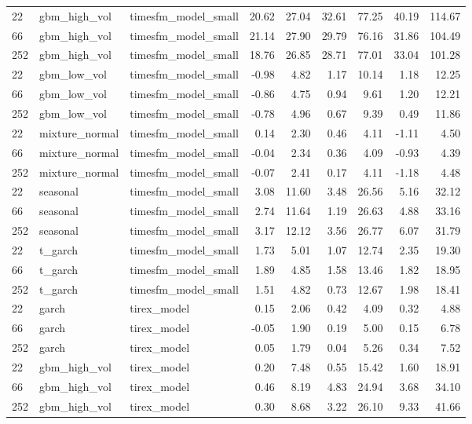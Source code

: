{\begin{tabular}{lllrrrrrr}
22 & gbm\_high\_vol & timesfm\_model\_small & 20.62 & 27.04 & 32.61 & 77.25 & 40.19 & 114.67 \\
66 & gbm\_high\_vol & timesfm\_model\_small & 21.14 & 27.90 & 29.79 & 76.16 & 31.86 & 104.49 \\
252 & gbm\_high\_vol & timesfm\_model\_small & 18.76 & 26.85 & 28.71 & 77.01 & 33.04 & 101.28 \\
\midrule
22 & gbm\_low\_vol & timesfm\_model\_small & -0.98 & 4.82 & 1.17 & 10.14 & 1.18 & 12.25 \\
66 & gbm\_low\_vol & timesfm\_model\_small & -0.86 & 4.75 & 0.94 & 9.61 & 1.20 & 12.21 \\
252 & gbm\_low\_vol & timesfm\_model\_small & -0.78 & 4.96 & 0.67 & 9.39 & 0.49 & 11.86 \\
\midrule
22 & mixture\_normal & timesfm\_model\_small & 0.14 & 2.30 & 0.46 & 4.11 & -1.11 & 4.50 \\
66 & mixture\_normal & timesfm\_model\_small & -0.04 & 2.34 & 0.36 & 4.09 & -0.93 & 4.39 \\
252 & mixture\_normal & timesfm\_model\_small & -0.07 & 2.41 & 0.17 & 4.11 & -1.18 & 4.48 \\
\midrule
22 & seasonal & timesfm\_model\_small & 3.08 & 11.60 & 3.48 & 26.56 & 5.16 & 32.12 \\
66 & seasonal & timesfm\_model\_small & 2.74 & 11.64 & 1.19 & 26.63 & 4.88 & 33.16 \\
252 & seasonal & timesfm\_model\_small & 3.17 & 12.12 & 3.56 & 26.77 & 6.07 & 31.79 \\
\midrule
22 & t\_garch & timesfm\_model\_small & 1.73 & 5.01 & 1.07 & 12.74 & 2.35 & 19.30 \\
66 & t\_garch & timesfm\_model\_small & 1.89 & 4.85 & 1.58 & 13.46 & 1.82 & 18.95 \\
252 & t\_garch & timesfm\_model\_small & 1.51 & 4.82 & 0.73 & 12.67 & 1.98 & 18.41 \\
\midrule
22 & garch & tirex\_model & 0.15 & 2.06 & 0.42 & 4.09 & 0.32 & 4.88 \\
66 & garch & tirex\_model & -0.05 & 1.90 & 0.19 & 5.00 & 0.15 & 6.78 \\
252 & garch & tirex\_model & 0.05 & 1.79 & 0.04 & 5.26 & 0.34 & 7.52 \\
\midrule
22 & gbm\_high\_vol & tirex\_model & 0.20 & 7.48 & 0.55 & 15.42 & 1.60 & 18.91 \\
66 & gbm\_high\_vol & tirex\_model & 0.46 & 8.19 & 4.83 & 24.94 & 3.68 & 34.10 \\
252 & gbm\_high\_vol & tirex\_model & 0.30 & 8.68 & 3.22 & 26.10 & 9.33 & 41.66 \\

\end{tabular}}
